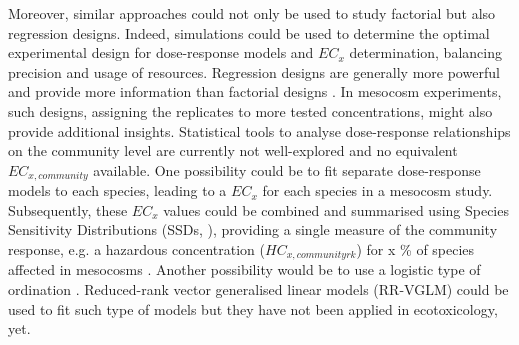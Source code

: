 Moreover, similar approaches could not only be used to study factorial but also regression designs.
Indeed, simulations could be used to determine the optimal experimental design for dose-response models and $EC_x$ determination, balancing precision and usage of resources. 
Regression designs are generally more powerful and provide more information than factorial designs  \citep{cottingham_knowing_2005}. 
In mesocosm experiments, such designs, assigning the replicates to more tested concentrations, might also provide additional insights.
Statistical tools to analyse dose-response relationships on the community level are currently not well-explored and no equivalent $EC_{x, community}$ available.
One possibility could be to fit separate dose-response models to each species, leading to a $EC_x$ for each species in a mesocosm study.
Subsequently, these $EC_x$ values could be combined and summarised using Species Sensitivity Distributions (SSDs, \citet{posthuma_species_2002}), providing a single measure of the community response, e.g. a hazardous concentration ($HC_{x, communityrk
}$) for x \% of species affected in mesocosms \citep{maltby_insecticide_2005}. 
Another possibility would be to use a logistic type of ordination \citep{van_den_brink_multivariate_2003}. 
Reduced-rank vector generalised linear models (RR-VGLM) could be used to fit such type of models \citep{yee_reduced-rank_2003, yee_vector_2015} but they have not been applied in ecotoxicology, yet.

